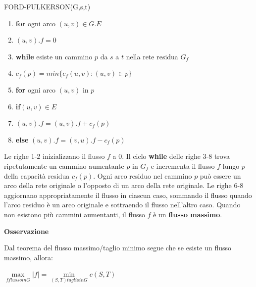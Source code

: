 \documentclass{article}
\begin{document}
\begin{flushleft}
\begin{flushleft}
FORD-FULKERSON(G,s,t)
\begin{enumerate} 
\item \textbf{for} ogni arco $(u, v) \in G.E$
\item \hspace{10pt} $(u, v).f = 0$
\item \textbf{while} esiste un cammino $p$ da $s$ a $t$ nella rete residua $G_f$
\item \hspace{10pt} $c_f(p) = min\{c_f(u, v): (u, v) \in p \}$
\item \hspace{10pt} \textbf{for} ogni arco $(u, v)$ in $p$
\item \hspace{20pt} \textbf{if}$(u, v) \in E$
\item \hspace{30pt} $(u, v).f = (u,v).f + c_f(p)$
\item \hspace{20pt} \textbf{else} $(u, v).f = (v, u).f - c_f(p)$
\end{enumerate}
\end{flushleft}
Le righe 1-2 inizializzano il flusso $f$ a 0. Il ciclo \textbf{while} delle righe 3-8 trova ripetutamente un cammino aumentante $p$ in $G_f$ e incrementa il flusso $f$ lungo $p$ della capacità residua $c_f(p)$. Ogni arco residuo nel cammino $p$ può essere un arco della rete originale o l'opposto di un arco della rete originale. Le righe 6-8 aggiornano appropriatamente il flusso in ciascun caso, sommando il flusso quando l'arco residuo è un arco originale e sottraendo il flusso nell'altro caso. Quando non esistono più cammini aumentanti, il flusso $f$ è un \textbf{flusso massimo}.
\newline
\newline
\begin{large} \textbf{Osservazione} \end{large}
\newline
\newline
Dal teorema del flusso massimo/taglio minimo segue che se esiste un flusso massimo, allora:
\newline
\newline
\begin{center}
$\max\limits_{f flusso in G} |f|  = \min\limits_{(S, T) taglio in G} c(S, T)$
\newline
\end{center}
\end{flushleft}
\end{document}
